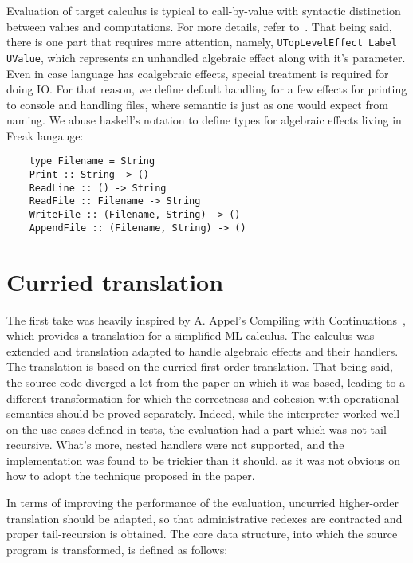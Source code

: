 \documentclass[declaration,shortabstract]{iithesis}
\theoremstyle{definition} \newtheorem{definition}{Definition}[chapter]
\theoremstyle{remark} \newtheorem{remark}[definition]{Observation}
\theoremstyle{plain} \newtheorem{theorem}[definition]{Theorem}
\theoremstyle{plain} \newtheorem{lemma}[definition]{Lemma}
\begin{document}
    \noindent
    Evaluation of target calculus is typical to call-by-value with syntactic
    distinction between values and computations. For more details, refer
    to~\cite{handlers-cps-journal}. That being said, there is one part
    that requires more attention, namely, \verb!UTopLevelEffect Label UValue!,
    which represents an unhandled algebraic effect along with it's parameter.
    Even in case language has coalgebraic effects, special treatment is required
    for doing IO\@. For that reason, we define default handling for a few effects
    for printing to console and handling files, where semantic is just as one
    would expect from naming. We abuse haskell's notation to define types for
    algebraic effects living in Freak langauge:

\begin{verbatim}
    type Filename = String
    Print :: String -> ()
    ReadLine :: () -> String
    ReadFile :: Filename -> String
    WriteFile :: (Filename, String) -> ()
    AppendFile :: (Filename, String) -> ()
\end{verbatim}

    \section{Curried translation}

    The first take was heavily inspired by A. Appel's Compiling with
    Continuations~\cite{appel-continuations}, which provides a translation for
    a simplified ML calculus. The calculus was extended and translation adapted to
    handle algebraic effects and their handlers. The translation is based on the curried
    first-order translation. That being said, the source code diverged a lot from the
    paper on which it was based, leading to a different transformation for which the
    correctness and cohesion with operational semantics should be proved separately.
    Indeed, while the interpreter worked well on the use cases defined in tests, the
    evaluation had a part which was not tail-recursive. What's more, nested handlers
    were not supported, and the implementation was found to be trickier than it should,
    as it was not obvious on how to adopt the technique proposed in the paper.

    In terms of improving the performance of the evaluation, uncurried higher-order
    translation should be adapted, so that administrative redexes are contracted
    and proper tail-recursion is obtained. The core data structure, into which the
    source program is transformed, is defined as follows:
\end{document}
